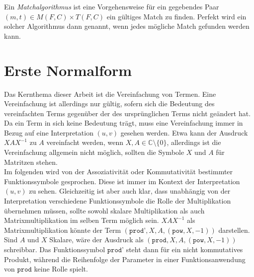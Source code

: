 \documentclass{scrartcl}
\numberwithin{figure}{section} %
\theoremstyle{definition} %
\begin{document}
Ein \emph{Matchalgorithmus} ist eine Vorgehensweise für ein gegebendes Paar $(m, t) \in M(F, C) \times T(F, C)$ ein gültiges Match zu finden. Perfekt wird ein solcher Algorithmus dann genannt, wenn jedes mögliche Match gefunden werden kann.



\section {Erste Normalform} \label{secErsteNormalform}

Das Kernthema dieser Arbeit ist die Vereinfachung von Termen. Eine Vereinfachung ist allerdings nur gültig, sofern sich die Bedeutung des vereinfachten Terms gegenüber der des ursprünglichen Terms nicht geändert hat. Da ein Term in sich keine Bedeutung trägt, muss eine Vereinfachung immer in Bezug auf eine Interpretation $(u, v)$ gesehen werden. Etwa kann der Ausdruck $X A X^{-1}$ zu $A$ vereinfacht werden, wenn $X, A \in \mathbb{C} \setminus \{0\}$, allerdings ist die Vereinfachung allgemein nicht möglich, sollten die Symbole $X$ und $A$ für Matritzen stehen. \\
Im folgenden wird von der Assoziativität oder Kommutativität bestimmter Funktionssymbole gesprochen. Diese ist immer im Kontext der Interpretation $(u, v)$ zu sehen. Gleichzeitig ist aber auch klar, dass unabhängig von der Interpretation verschiedene Funktionssymbole die Rolle der Multiplikation übernehmen müssen, sollte sowohl skalare Multiplikation als auch Matrixmultiplikation im selben Term möglich sein. $X A X^{-1}$ als Matrixmultiplikation könnte der Term $(\texttt{prod'}, X, A, (\texttt{pow}, X, -1))$ darstellen. Sind $A$ und $X$ Skalare, wäre der Ausdruck als $(\texttt{prod}, X, A, (\texttt{pow}, X, -1))$ schreibbar. Das Funktionssymbol $\texttt{prod'}$ steht dann für ein nicht kommutatives Produkt, während die Reihenfolge der Parameter in einer Funktionsanwendung von $\texttt{prod}$ keine Rolle spielt.\\
\end{document}
